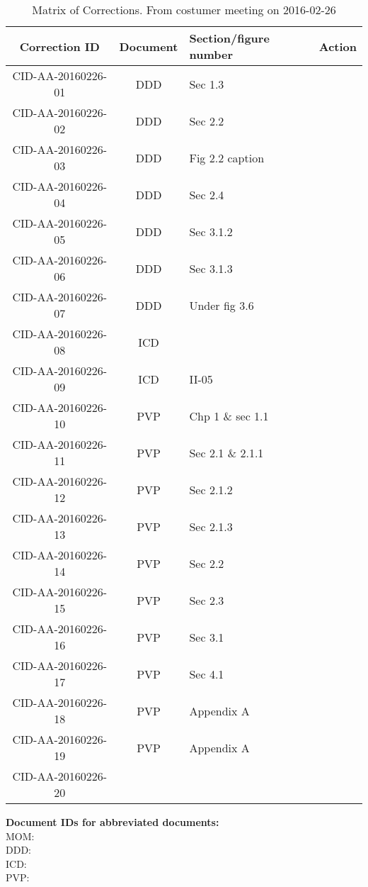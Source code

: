 \begin{table}[ht]
\centering
\begin{tabular}{|c|c|>{\centering\arraybackslash}p{3cm}|>{\centering\arraybackslash}p{5cm}|}
\hline \textbf{Correction ID} & \textbf{Document} & \textbf{Section/figure number} & \textbf{Action} \\ 
\hline CID-AA-20160226-01 & DDD & Sec 1.3 & \\ 
\hline CID-AA-20160226-02 & DDD & Sec 2.2 & \\ 
\hline CID-AA-20160226-03 & DDD & Fig 2.2 caption & \\ 
\hline CID-AA-20160226-04 & DDD & Sec 2.4 & \\ 
\hline CID-AA-20160226-05 & DDD & Sec 3.1.2 & \\ 
\hline CID-AA-20160226-06 & DDD & Sec 3.1.3 & \\ 
\hline CID-AA-20160226-07 & DDD & Under fig 3.6 & \\ 
\hline CID-AA-20160226-08 & ICD &  & \\ 
\hline CID-AA-20160226-09 & ICD & II-05 & \\ 
\hline CID-AA-20160226-10 & PVP & Chp 1 \& sec 1.1 & \\ 
\hline CID-AA-20160226-11 & PVP & Sec 2.1 \& 2.1.1 & \\ 
\hline CID-AA-20160226-12 & PVP & Sec 2.1.2 & \\ 
\hline CID-AA-20160226-13 & PVP & Sec 2.1.3 & \\ 
\hline CID-AA-20160226-14 & PVP & Sec 2.2 & \\ 
\hline CID-AA-20160226-15 & PVP & Sec 2.3 & \\ 
\hline CID-AA-20160226-16 & PVP & Sec 3.1 & \\ 
\hline CID-AA-20160226-17 & PVP & Sec 4.1 & \\ 
\hline CID-AA-20160226-18 & PVP & Appendix A & \\ 
\hline CID-AA-20160226-19 & PVP & Appendix A & \\ 
\hline CID-AA-20160226-20 &  &  & \\ 
\hline 
\end{tabular}
\caption{Matrix of Corrections. From costumer meeting on 2016-02-26}
\label{tb:MoC} 
\end{table}

\vspace{20pt}
\noindent \textbf{Document IDs for abbreviated documents:}\\
MOM:        \momFebTwentySix \\
DDD:        \ddd \\
ICD:        \icd \\
PVP:        \pvp \\